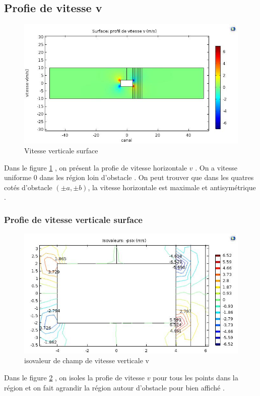 \documentclass[a4paper,11pt]{report} %
\begin{document}
\subsection{Profie de vitesse v}
\begin{figure}[!h]
\centering
\hspace*{0mm}\vfill
\begin{center} \includegraphics[width=1.\textwidth]{v_surface.jpg} \end{center}
\vfill\hspace*{0mm}
\caption{Vitesse verticale surface }
\label{vitesse_v}
\end{figure}\pagebreak
Dans le figure \ref{vitesse_v} , on présent la profie de vitesse horizontale $v$ . On a vitesse uniforme $0$ dans les région loin d'obstacle . On peut trouver que dans les quatres cotés d'obstacle $(\pm a,\pm b)$, la vitesse horizontale est maximale et antisymétrique .  

\subsubsection{Profie de vitesse verticale surface}
\begin{figure}[!h]
\centering
\hspace*{0mm}\vfill
\begin{center} \includegraphics[width=1.\textwidth]{iso_v_surface.jpg} \end{center}
\vfill\hspace*{0mm}
\caption{isovaleur de champ de vitesse verticale v}
\label{vitesse_v_iso}
\end{figure}\pagebreak
Dans le figure \ref{vitesse_v_iso} , on isoles la profie de vitesse $v$ pour tous les points dans la région et on fait agrandir la région autour d'obstacle pour bien affiché . 
\end{document}
